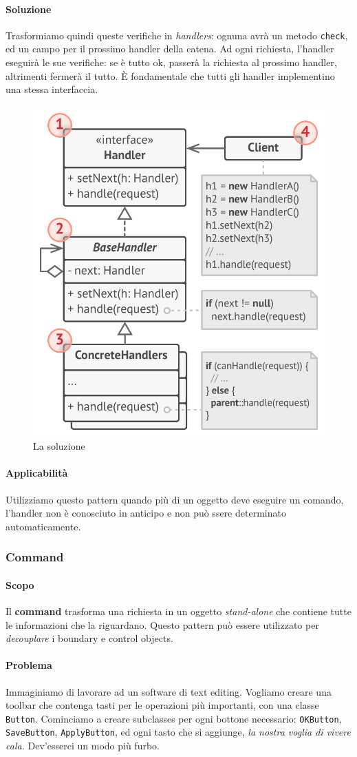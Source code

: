 \documentclass[11pt]{article}
\newcommand{\code}[1]{\texttt{#1}}
\begin{document}
\paragraph{Soluzione}
Trasformiamo quindi queste verifiche in \textit{handlers}: ognuna avrà un metodo \code{check}, ed un campo per il prossimo handler della catena. Ad ogni richiesta, l'handler eseguirà le sue verifiche: se è tutto ok, passerà la richiesta al prossimo handler, altrimenti fermerà il tutto. È fondamentale che tutti gli handler implementino una stessa interfaccia. 
\begin{figure}[H]
    \centering
    \includegraphics[width=0.6\linewidth]{res/teoria/Handler.png}
    \caption{La soluzione}
\end{figure}
\paragraph{Applicabilità}
Utilizziamo questo pattern quando più di un oggetto deve eseguire un comando, l'handler non è conosciuto in anticipo e non può ssere determinato automaticamente.
\subsubsection{Command}
\paragraph{Scopo}
Il \textbf{command} trasforma una richiesta in un oggetto \textit{stand-alone} che contiene tutte le informazioni che la riguardano. Questo pattern può essere utilizzato per \textit{decouplare} i boundary e control objects.
\paragraph{Problema}
Immaginiamo di lavorare ad un software di text editing. Vogliamo creare una toolbar che contenga tasti per le operazioni più importanti, con una classe \code{Button}. Cominciamo a creare subclasses per ogni bottone necessario: \code{OKButton}, \code{SaveButton}, \code{ApplyButton}, ed ogni tasto che si aggiunge, \textit{la nostra voglia di vivere cala.} Dev'esserci un modo più furbo.
\end{document}
